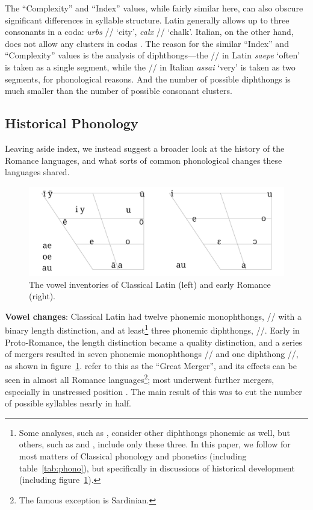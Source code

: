 \documentclass[12pt,twoside]{article}
\newcommand{\ipa}[1]{/\textipa{#1}/}
\begin{document}
The ``Complexity'' and ``Index'' values, while fairly similar here, can also obscure significant differences in syllable structure. Latin generally allows up to three consonants in a coda: \emph{urbs} \ipa{urps} `city', \emph{calx} \ipa{kalks} `chalk'. Italian, on the other hand, does not allow any clusters in codas \citep{hall}. The reason for the similar ``Index'' and ``Complexity'' values is the analysis of diphthongs---the \ipa{a\textsubarch{e}} in Latin \emph{saepe} `often' is taken as a single segment, while the \ipa{a\textsubarch{i}} in Italian \emph{assai} `very' is taken as two segments, for phonological reasons. And the number of possible diphthongs is much smaller than the number of possible consonant clusters.

\subsection{Historical Phonology}

Leaving aside  index, we instead suggest a broader look at the history of the Romance languages, and what sorts of common phonological changes these languages shared.

\begin{figure}[h]
\centering
\caption{The vowel inventories of Classical Latin (left) and early Romance (right).}
\label{fig:vowels}
\noindent\includegraphics[width=\linewidth]{vowelchange}
\end{figure}

\textbf{Vowel changes}: Classical Latin had twelve phonemic monophthongs, \ipa{i y e a o u} with a binary length distinction, and at least\footnote{Some analyses, such as \citet{allen}, consider other diphthongs phonemic as well, but others, such as \citet{alkire} and \citet{boyd}, include only these three. In this paper, we follow \citeauthor{allen} for most matters of Classical phonology and phonetics (including table~\ref{tab:phono}), but \citet{alkire} specifically in discussions of historical development (including figure~\ref{fig:vowels}).} three phonemic diphthongs, \ipa{a\textsubarch{e} o\textsubarch{e} a\textsubarch{u}}. Early in Proto-Romance, the length distinction became a quality distinction, and a series of mergers resulted in seven phonemic monophthongs \ipa{i e E a O o u} and one diphthong \ipa{a\textsubarch{u}}, as shown in figure~\ref{fig:vowels}. \citet{alkire} refer to this as the ``Great Merger'', and its effects can be seen in almost all Romance languages\footnote{The famous exception is Sardinian.}; most underwent further mergers, especially in unstressed position \citep{alkire,boyd}. The main result of this was to cut the number of possible syllables nearly in half.
\end{document}
